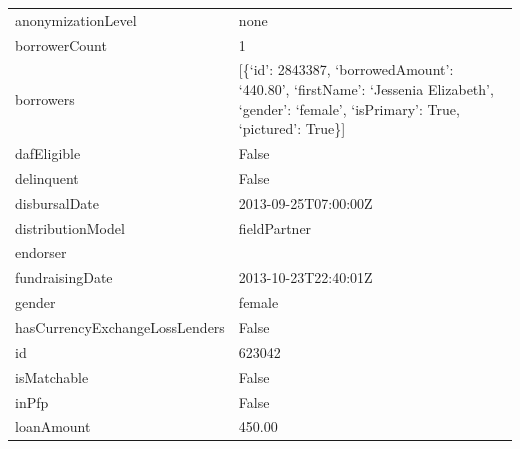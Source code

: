 \begin{longtable}{|p{}|p{}|}
	anonymizationLevel                              & none                                                                \\
	borrowerCount                                   & 1                                                                   \\
	borrowers                                       & {[}\{`id': 2843387, `borrowedAmount': `440.80', `firstName':
	`Jessenia Elizabeth', `gender': `female', `isPrimary': True, `pictured':
	True\}{]}                                                                                                             \\
	dafEligible                                     & False                                                               \\
	delinquent                                      & False                                                               \\
	disbursalDate                                   & 2013-09-25T07:00:00Z                                                \\
	distributionModel                               & fieldPartner                                                        \\
	endorser                                        &                                                                     \\
	fundraisingDate                                 & 2013-10-23T22:40:01Z                                                \\
	gender                                          & female                                                              \\
	hasCurrencyExchangeLossLenders                  & False                                                               \\
	id                                              & 623042                                                              \\
	isMatchable                                     & False                                                               \\
	inPfp                                           & False                                                               \\
	loanAmount                                      & 450.00                                                              \\

\end{longtable}
